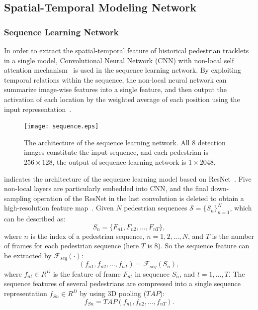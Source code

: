 \documentclass[times,twocolumn,final,authoryear]{elsarticle}
\begin{document}
\subsection{Spatial-Temporal Modeling Network}
\vspace{5pt}
\noindent
\subsubsection{Sequence Learning Network}
\label{sec:videomodel}

In order to extract the spatial-temporal feature of historical pedestrian tracklets in a single model, Convolutional Neural Network (CNN) with non-local self attention mechanism~\citep{RN580} is used in the sequence learning network.
By exploiting temporal relations within the sequence, the non-local neural network can summarize image-wise features into a single feature, and then output the activation of each location by the weighted average of each position using the input representation~\citep{RN580}.


\begin{figure}[!ht]
	\centering
	\texttt{[image: sequence.eps]}
	\caption{The architecture of the sequence learning network. 
		All 8 detection images constitute the input sequence, and each pedestrian is $256\times 128$, the output of sequence learning network is $1\times2048$.}
	\label{fig:sequence}
\end{figure}

 indicates the architecture of the sequence learning model based on ResNet{~\citep{he2016deep}}.
Five non-local layers are particularly embedded into CNN, 
and the final down-sampling operation of the ResNet in the last convolution is deleted to obtain a high-resolution feature map~\citep{RN985}.
Given $N$ pedestrian sequences $\mathcal{S}=\{S_n\}^N_{n=1}$, which can be described as:
\begin{equation}\label{eq:pedestrian_sequence}
S_n=\{F_{n1},F_{n2},...,F_{nT}\},
\end{equation}
where $n$ is the index of a pedestrian sequence, $n=1,2,...,N$, and $T$ is the number of frames for each pedestrian sequence (here $T$ is 8). 
So the sequence feature can be extracted by $\mathcal{F}_{seq}(\cdot)$:
\begin{equation}\label{eq:sequence_network}
\left( f_{n1},f_{n2},...,f_{nT} \right)=\mathcal{F}_{seq}(S_n),
\end{equation}
where $f_{nt} \in R^{D}$ is the feature of frame $F_{nt}$ in sequence $S_{n}$, and $t=1,...,T$.
The sequence features of several pedestrians are compressed into a single sequence representation $f_{Sn}\in R^{D}$ by using 3D pooling ($TAP$):
\begin{equation}\label{eq:tap}
f_{Sn}=TAP\left( f_{n1},f_{n2},...,f_{nT} \right).
\end{equation}
\end{document}
